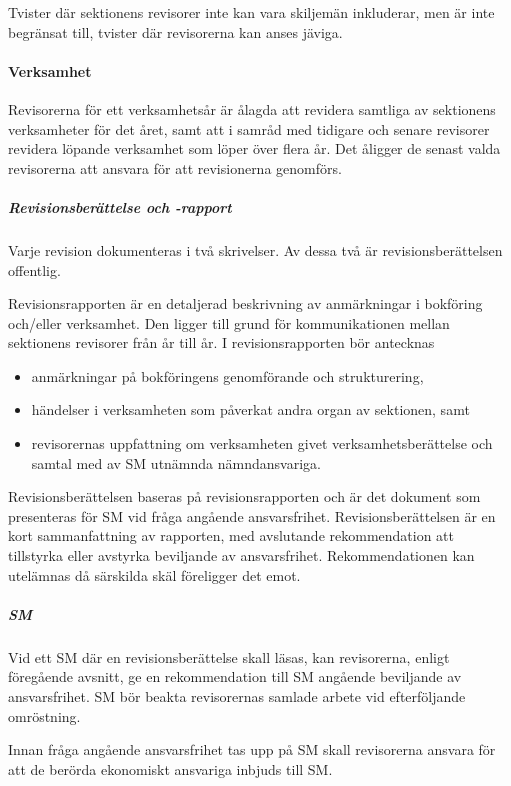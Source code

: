\documentclass{dgovdoc}
\begin{document}
Tvister där sektionens revisorer inte kan vara skiljemän inkluderar, men är
inte begränsat till, tvister där revisorerna kan anses jäviga.

\paragraph{Verksamhet}

Revisorerna för ett verksamhetsår är ålagda att revidera samtliga av sektionens
verksamheter för det året, samt att i samråd med tidigare och senare revisorer
revidera löpande verksamhet som löper över flera år. Det åligger de senast
valda revisorerna att ansvara för att revisionerna genomförs.

\subparagraph{Revisionsberättelse och -rapport}

Varje revision dokumenteras i två skrivelser. Av dessa två är
revisionsberättelsen offentlig.

Revisionsrapporten är en detaljerad beskrivning av anmärkningar i bokföring
och/eller verksamhet. Den ligger till grund för kommunikationen mellan
sektionens revisorer från år till år. I
revisionsrapporten bör antecknas

\begin{itemize}
  \item anmärkningar på bokföringens genomförande och strukturering,
  \item händelser i verksamheten som påverkat andra organ av sektionen, samt
  \item revisorernas uppfattning om verksamheten givet verksamhetsberättelse
    och samtal med av SM utnämnda nämndansvariga.
\end{itemize}

Revisionsberättelsen baseras på revisionsrapporten och är det dokument som
presenteras för SM vid fråga angående ansvarsfrihet. Revisionsberättelsen är en
kort sammanfattning av rapporten, med avslutande rekommendation att tillstyrka
eller avstyrka beviljande av ansvarsfrihet. Rekommendationen kan utelämnas då
särskilda skäl föreligger det emot.

\subparagraph{SM}

Vid ett SM där en revisionsberättelse skall läsas, kan revisorerna, enligt
föregående avsnitt, ge en rekommendation till SM angående beviljande av
ansvarsfrihet. SM bör beakta revisorernas samlade arbete vid efterföljande
omröstning.

Innan fråga angående ansvarsfrihet tas upp på SM skall revisorerna ansvara för
att de berörda ekonomiskt ansvariga inbjuds till SM.
\end{document}

